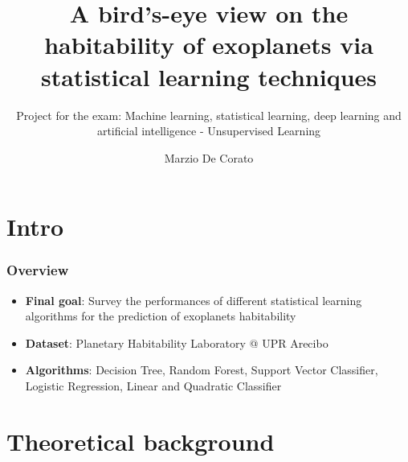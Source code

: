 \documentclass[compress]{beamer}
\author{Marzio De Corato}
\title[Exoplanets survey via SL techniques]{A bird’s-eye view on the habitability of exoplanets via statistical learning techniques}
\author{}
\date{}
\subtitle{Project for the exam: Machine learning, statistical
learning, deep learning and artificial intelligence - Unsupervised Learning}
\begin{document}
\frame{\vspace{+4.5cm}\titlepage}

\usebackgroundtemplate{ } 

\section{Intro}

\begin{frame}
\frametitle{Overview}
\begin{itemize}
\item\textbf{Final goal}: Survey the performances of different statistical learning algorithms for the prediction of exoplanets habitability
\item\textbf{Dataset}: Planetary Habitability Laboratory @ UPR Arecibo \cite{planet_dataset}
\item\textbf{Algorithms}: Decision Tree, Random Forest, Support Vector Classifier, Logistic Regression, Linear and Quadratic Classifier
\end{itemize}
\end{frame}

\section{Theoretical background}
\end{document}
